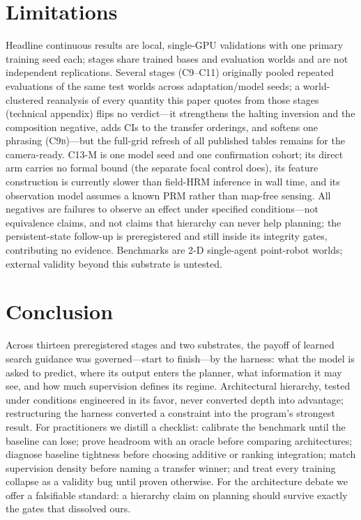 \documentclass[letterpaper]{article} %
\newcommand{\stage}[1]{\textsc{#1}}
\begin{document}
\section{Limitations}

Headline continuous results are local, single-GPU validations with one primary training seed each; stages share trained bases and evaluation worlds and are not independent replications. Several stages (\stage{C9}--\stage{C11}) originally pooled repeated evaluations of the same test worlds across adaptation/model seeds; a world-clustered reanalysis of every quantity this paper quotes from those stages (technical appendix) flips no verdict---it strengthens the halting inversion and the composition negative, adds CIs to the transfer orderings, and softens one phrasing (\stage{C9b})---but the full-grid refresh of all published tables remains for the camera-ready. \stage{C13-M} is one model seed and one confirmation cohort; its direct arm carries no formal bound (the separate focal control does), its feature construction is currently slower than field-HRM inference in wall time, and its observation model assumes a known PRM rather than map-free sensing. All negatives are failures to observe an effect under specified conditions---not equivalence claims, and not claims that hierarchy can never help planning; the persistent-state follow-up is preregistered and still inside its integrity gates, contributing no evidence. Benchmarks are 2-D single-agent point-robot worlds; external validity beyond this substrate is untested.

\section{Conclusion}

Across thirteen preregistered stages and two substrates, the payoff of learned search guidance was governed---start to finish---by the harness: what the model is asked to predict, where its output enters the planner, what information it may see, and how much supervision defines its regime. Architectural hierarchy, tested under conditions engineered in its favor, never converted depth into advantage; restructuring the harness converted a constraint into the program's strongest result. For practitioners we distill a checklist: calibrate the benchmark until the baseline can lose; prove headroom with an oracle before comparing architectures; diagnose baseline tightness before choosing additive or ranking integration; match supervision density before naming a transfer winner; and treat every training collapse as a validity bug until proven otherwise. For the architecture debate we offer a falsifiable standard: a hierarchy claim on planning should survive exactly the gates that dissolved ours.


\end{document}
